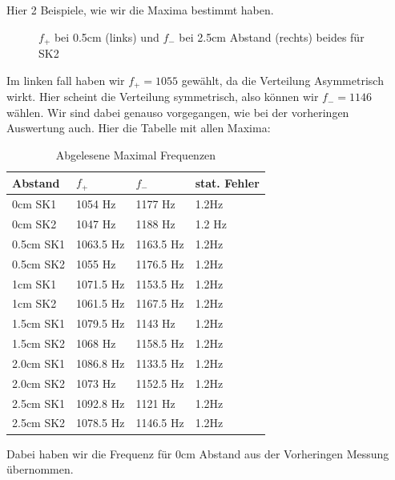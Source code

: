 \documentclass[twoside]{protokoll}
\begin{document}
 
Hier 2 Beispiele, wie wir die Maxima bestimmt haben.
\begin{figure}[H]
    \centering
    \caption{$f_+$ bei 0.5cm (links) und $f_-$ bei 2.5cm Abstand (rechts) beides für SK2}
\end{figure}
Im linken fall haben wir $f_+ = 1055$ gewählt, da die Verteilung Asymmetrisch wirkt.
Hier scheint die Verteilung symmetrisch, also können wir $f_- = 1146$ wählen.
Wir sind dabei genauso vorgegangen, wie bei der vorheringen Auswertung auch.
Hier die Tabelle mit allen Maxima:
\begin{table}[H]
        \centering
        \caption{Abgelesene Maximal Frequenzen}
        \begin{tabularx}{1\textwidth}{X X X X}
            \toprule
            \textbf{Abstand} & \textbf{$f_+$} & \textbf{$f_-$} & \textbf{stat. Fehler} \\
            \midrule

            0cm SK1 &  1054 Hz & 1177 Hz & 1.2Hz \\
            0cm SK2 &  1047 Hz & 1188 Hz & 1.2 Hz\\
            0.5cm SK1 &  1063.5 Hz & 1163.5 Hz & 1.2Hz \\
            0.5cm SK2 &  1055 Hz & 1176.5 Hz & 1.2Hz \\
            1cm SK1 &  1071.5 Hz & 1153.5 Hz & 1.2Hz \\
            1cm SK2 &  1061.5 Hz & 1167.5 Hz & 1.2Hz \\
            1.5cm SK1 &  1079.5 Hz & 1143 Hz & 1.2Hz \\
            1.5cm SK2 &  1068 Hz & 1158.5 Hz & 1.2Hz \\
            2.0cm SK1 &  1086.8 Hz & 1133.5 Hz & 1.2Hz \\
            2.0cm SK2 &  1073 Hz & 1152.5 Hz & 1.2Hz \\
            2.5cm SK1 &  1092.8 Hz & 1121 Hz & 1.2Hz \\
            2.5cm SK2 &  1078.5 Hz & 1146.5 Hz & 1.2Hz \\

            \bottomrule
        \end{tabularx}
        \label{tab:mytable}
    \end{table}
Dabei haben wir die Frequenz für 0cm Abstand aus der Vorheringen Messung übernommen.
\end{document}
